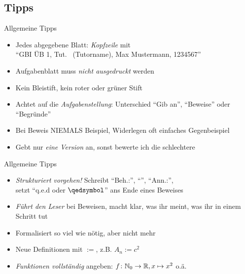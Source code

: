 \subsection{Tipps}
\begin{frame}{Allgemeine Tipps}
    \begin{itemize}[<+->]
    	\item Jedes abgegebene Blatt: \emph{Kopfzeile} mit \\{\centering``GBI ÜB 1, \quad Tut. \hashtag\mytutnumber\ (Tutorname), \quad Max Mustermann, 1234567''}
    	\item Aufgabenblatt muss \emph{nicht ausgedruckt} werden
		\item Kein Bleistift, kein roter oder grüner Stift
		\item Achtet auf die \emph{Aufgabenstellung}: Unterschied  ``Gib an'', ``Beweise'' oder ``Begründe''
		\item Bei Beweis \alert{NIEMALS} Beispiel, Widerlegen oft einfaches Gegenbeispiel
		\item Gebt nur \emph{eine Version} an, sonst bewerte ich die schlechtere
    	\end{itemize}
\end{frame}

\begin{frame}{Allgemeine Tipps}
    \begin{itemize}[<+->]
    	\item \emph{Strukturiert vorgehen!} Schreibt ``Beh.:'', ``\zz'', ``Ann.:'',\\
    	setzt ``q.e.d oder $\qedsymbol$'' ans Ende eines Beweises
    	\item \emph{Führt den Leser} bei Beweisen, macht klar, was ihr meint, was ihr in einem Schritt tut
    	\item Formalisiert so viel wie nötig, aber nicht mehr
    	\item Neue Definitionen mit \emph{$:=$}, z.B. $A_n := c^2$
    	\item \emph{Funktionen vollständig} angeben: $f \colon \mathbb{N}_0 \to \mathbb{R}, x \mapsto x^2$ o.ä.
    \end{itemize}
\end{frame}